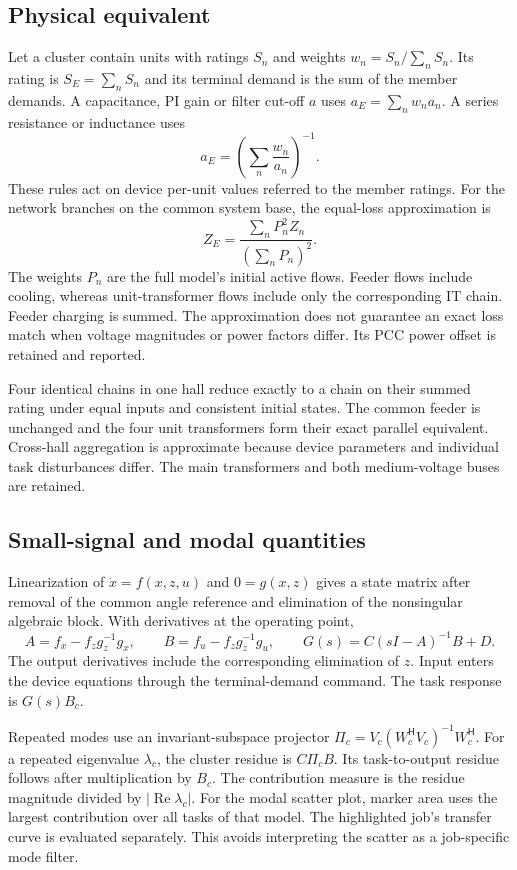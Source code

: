 \subsection{Physical equivalent}
Let a cluster contain units with ratings $S_n$ and weights $w_n=S_n/\sum_n S_n$.
Its rating is $S_E=\sum_nS_n$ and its terminal demand is the sum of the member demands.
A capacitance, PI gain or filter cut-off $a$ uses $a_E=\sum_nw_na_n$.
A series resistance or inductance uses
\begin{equation}
a_E=\left(\sum_n\frac{w_n}{a_n}\right)^{-1}.
\end{equation}
These rules act on device per-unit values referred to the member ratings.
For the network branches on the common system base, the equal-loss approximation is
\begin{equation}
Z_E=\frac{\sum_n P_n^2Z_n}{(\sum_nP_n)^2}.
\end{equation}
The weights $P_n$ are the full model's initial active flows.
Feeder flows include cooling, whereas unit-transformer flows include only the corresponding IT chain.
Feeder charging is summed.
The approximation does not guarantee an exact loss match when voltage magnitudes or power factors differ.
Its PCC power offset is retained and reported.

Four identical chains in one hall reduce exactly to a chain on their summed rating under equal inputs and consistent initial states.
The common feeder is unchanged and the four unit transformers form their exact parallel equivalent.
Cross-hall aggregation is approximate because device parameters and individual task disturbances differ.
The main transformers and both medium-voltage buses are retained.

\subsection{Small-signal and modal quantities}
Linearization of $\dot x=f(x,z,u)$ and $0=g(x,z)$ gives a state matrix after removal of the common angle reference and elimination of the nonsingular algebraic block.
With derivatives at the operating point,
\begin{equation}
A=f_x-f_zg_z^{-1}g_x,\qquad B=f_u-f_zg_z^{-1}g_u,\qquad G(s)=C(sI-A)^{-1}B+D.
\end{equation}
The output derivatives include the corresponding elimination of $z$.
Input enters the device equations through the terminal-demand command.
The task response is $G(s)B_c$.

Repeated modes use an invariant-subspace projector $\Pi_c=V_c(W_c^{\mathsf H}V_c)^{-1}W_c^{\mathsf H}$.
For a repeated eigenvalue $\lambda_c$, the cluster residue is $C\Pi_cB$.
Its task-to-output residue follows after multiplication by $B_c$.
The contribution measure is the residue magnitude divided by $|\operatorname{Re}\lambda_c|$.
For the modal scatter plot, marker area uses the largest contribution over all tasks of that model.
The highlighted job's transfer curve is evaluated separately.
This avoids interpreting the scatter as a job-specific mode filter.

